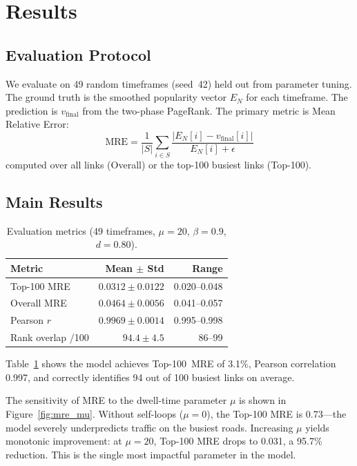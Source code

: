 \documentclass[11pt]{article}
\newcommand{\vfinal}{v_{\text{final}}}
\newcommand{\MRE}{\text{MRE}}
\begin{document}
\section{Results}
\label{sec:results}

\subsection{Evaluation Protocol}

We evaluate on 49 random timeframes (seed~42) held out from parameter tuning.
The ground truth is the smoothed popularity vector $E_N$ for each timeframe.
The prediction is $\vfinal$ from the two-phase PageRank.
The primary metric is Mean Relative Error:
\begin{equation}
    \MRE = \frac{1}{|S|}\sum_{i \in S} \frac{|E_N[i] - \vfinal[i]|}{E_N[i] + \epsilon}
\end{equation}
computed over all links (Overall) or the top-100 busiest links (Top-100).

\subsection{Main Results}

\begin{table}[t]
\centering
\caption{Evaluation metrics (49 timeframes, $\mu{=}20$, $\beta{=}0.9$, $d{=}0.80$).}
\label{tab:main_results}
\small
\begin{tabular}{lrr}
\toprule
Metric & Mean $\pm$ Std & Range \\
\midrule
Top-100 MRE & $0.0312 \pm 0.0122$ & 0.020--0.048 \\
Overall MRE & $0.0464 \pm 0.0056$ & 0.041--0.057 \\
Pearson $r$ & $0.9969 \pm 0.0014$ & 0.995--0.998 \\
Rank overlap /100 & $94.4 \pm 4.5$ & 86--99 \\
\bottomrule
\end{tabular}
\end{table}

Table~\ref{tab:main_results} shows the model achieves Top-100~MRE of 3.1\%, Pearson correlation 0.997, and correctly identifies 94 out of 100 busiest links on average.

The sensitivity of MRE to the dwell-time parameter $\mu$ is shown in Figure~\ref{fig:mre_mu}. Without self-loops ($\mu = 0$), the Top-100 MRE is 0.73---the model severely underpredicts traffic on the busiest roads. Increasing $\mu$ yields monotonic improvement: at $\mu = 20$, Top-100 MRE drops to 0.031, a 95.7\% reduction. This is the single most impactful parameter in the model.
\end{document}
